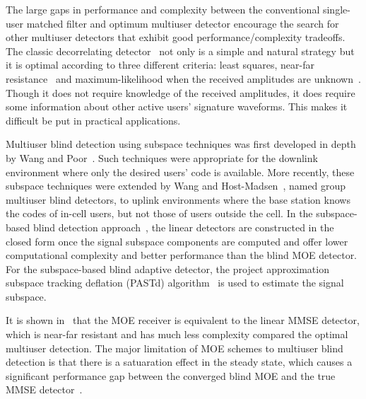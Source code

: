 \documentclass[a4paper,11pt,fleqn]{article}
\begin{document}
The large gaps in performance and complexity between the
conventional single-user matched filter and optimum multiuser
detector encourage the search for other multiuser detectors that
exhibit good performance/complexity tradeoffs. The classic
decorrelating detector~\cite{Lupa89} not only is a simple and
natural strategy but it is optimal according to three different
criteria: least squares, near-far resistance~\cite{Verd86} and
maximum-likelihood when the received amplitudes are
unknown~\cite{Lupa89}. Though it does not require knowledge of the
received amplitudes, it does require some information about other
active users' signature waveforms. This makes it difficult be put
in practical applications.

Multiuser blind detection using subspace techniques was first
developed in depth by Wang and Poor~\cite{Wang98, Poor98}. Such
techniques were appropriate for the downlink environment where
only the desired users' code is available. More recently, these
subspace techniques were extended by Wang and
Host-Madsen~\cite{Wang99}, named group multiuser blind detectors,
to uplink environments where the base station knows the codes of
in-cell users, but not those of users outside the cell. In the
subspace-based blind detection approach~\cite{Wang98}, the linear
detectors are constructed in the closed form once the signal
subspace components are computed and offer lower computational
complexity and better performance than the blind MOE detector. For
the subspace-based blind adaptive detector, the project
approximation subspace tracking deflation (PASTd)
algorithm~\cite{Yang95} is used to estimate the signal subspace.

It is shown in~\cite{Honi95} that the MOE receiver is equivalent
to the linear MMSE detector, which is near-far resistant and has
much less complexity compared the optimal multiuser detection. The
major limitation of MOE schemes to multiuser blind detection is
that there is a satuaration effect in the steady state, which
causes a significant performance gap between the converged blind
MOE and the true MMSE detector~\cite{Honi95}.
\end{document}
